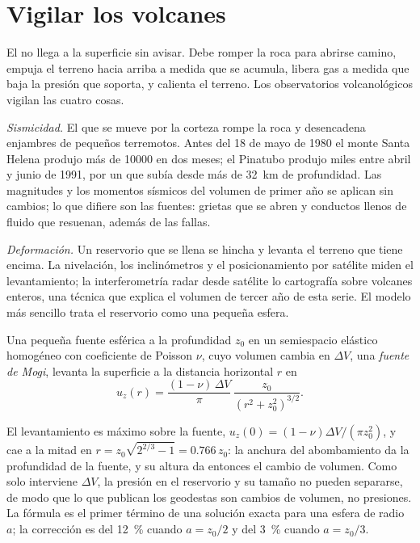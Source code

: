 \section{Vigilar los volcanes}

El  no llega a la superficie sin avisar. Debe romper la roca para abrirse
camino, empuja el terreno hacia arriba a medida que se acumula, libera gas a medida que baja la presión
que soporta, y calienta el terreno. Los observatorios volcanológicos vigilan las cuatro cosas.

\emph{Sismicidad.} El  que se mueve por la corteza rompe la roca y desencadena enjambres
de pequeños terremotos. Antes del 18 de mayo de 1980 el monte Santa Helena produjo más de
\num{10000} en dos meses; el Pinatubo produjo miles entre abril y
junio de 1991, por un  que subía desde más de \qty{32}{km} de profundidad. Las magnitudes
y los momentos sísmicos del volumen de primer año se aplican sin cambios; lo que difiere son las
fuentes: grietas que se abren y conductos llenos de fluido que resuenan, además de las fallas.

\emph{Deformación.} Un reservorio que se llena se hincha y levanta el terreno que tiene
encima. La nivelación, los inclinómetros y el posicionamiento por satélite miden el levantamiento; la interferometría radar desde satélite lo cartografía sobre volcanes
enteros, una técnica que explica el volumen de tercer año de esta serie. El modelo más
sencillo trata el reservorio como una pequeña esfera.

\begin{proposition}\label{prop:b2:eruptive-styles:mogi}
Una pequeña fuente esférica a la profundidad $z_0$ en un semiespacio elástico homogéneo
con coeficiente de Poisson $\nu$, cuyo volumen cambia en $\Delta V$, una
\emph{fuente de Mogi}, levanta la superficie a la distancia horizontal $r$
en
\[
u_z(r) = \frac{(1 - \nu)\,\Delta V}{\pi}\,\frac{z_0}{(r^2 + z_0^2)^{3/2}} .
\]
\end{proposition}
\admitted

El levantamiento es máximo sobre la fuente, $u_z(0) = (1 - \nu)\Delta V/(\pi z_0^2)$, y
cae a la mitad en $r = z_0\sqrt{2^{2/3} - 1} = 0.766\,z_0$: la anchura del
abombamiento da la profundidad de la fuente, y su altura da entonces el cambio de
volumen. Como solo interviene $\Delta V$, la presión en el reservorio y su tamaño
no pueden separarse, de modo que lo que publican los geodestas son cambios de volumen, no presiones.
La fórmula es el primer término de una solución exacta para una esfera de radio
$a$; la corrección es del \qty{12}{\percent} cuando $a = z_0/2$ y del \qty{3}{\percent}
cuando $a = z_0/3$.

